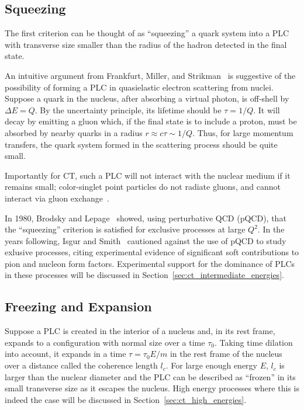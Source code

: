 \subsection{Squeezing}
The first criterion can be thought of as ``squeezing'' a quark system into a
PLC with transverse size smaller than the radius of the hadron detected in
the final state.




An intuitive argument from Frankfurt, Miller, and
Strikman~\cite{Frankfurt_1992} is suggestive of the possibility of forming a
PLC in quasielastic electron scattering from nuclei.
Suppose a quark in the nucleus, after absorbing a virtual photon, is off-shell
by $\Delta E = Q$.
By the uncertainty principle, its lifetime should be $\tau=1/Q$.
It will decay by emitting a gluon which, if the final state is to include a
proton, must be absorbed by nearby quarks in a radius
$r \approx c \tau \sim 1/Q$.
Thus, for large momentum transfers, the quark system formed in the scattering
process should be quite small.


Importantly for CT, such a PLC will not interact with the nuclear medium if it
remains small; color-singlet point particles do not radiate gluons, and cannot
interact via gluon exchange~\cite{Gunion_1977}.


In 1980, Brodsky and Lepage~\cite{Brodsky_1980, Lepage_1980} showed, using
perturbative QCD (pQCD), that the ``squeezing'' criterion is satisfied for
exclusive processes at large $Q^2$.
In the years following, Isgur and Smith~\cite{Isgur_1984, Isgur_1988,
Isgur_1989} cautioned against the use of pQCD to study exlusive processes,
citing experimental evidence of significant soft contributions to pion and
nucleon form factors.
Experimental support for the dominance of PLCs in these processes will be
discussed in Section~\ref{sec:ct_intermediate_energies}.


\subsection{Freezing and Expansion}
Suppose a PLC is created in the interior of a nucleus and, in its rest frame,
expands to a configuration with normal size over a time $\tau_0$.
Taking time dilation into account, it expands in a time $\tau=\tau_0E/m$ in the
rest frame of the nucleus over a distance called the coherence length $l_c$.
For large enough energy $E$, $l_c$ is larger than the nuclear diameter and the
PLC can be described as ``frozen'' in its small transverse size as it escapes
the nucleus.
High energy processes where this is indeed the case will be discussed in
Section~\ref{sec:ct_high_energies}.


